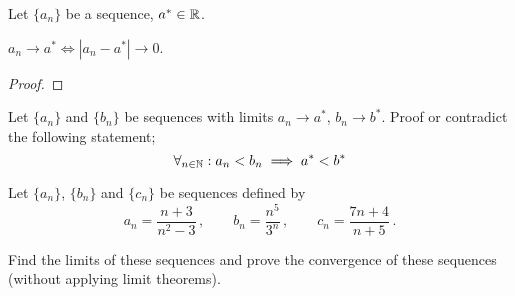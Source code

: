 \documentclass[week=2]{homework}
\begin{document}
\begin{questions}
    
	    \question
	    Let $\{a_n\}$ be a sequence, $a^* \in \mathbb{R}$.
	    
	    \begin{inlinetoprove}
	    	$a_n \to a^* \iff |a_n - a^*| \to 0$.
	    \end{inlinetoprove}
	    \begin{proof}
	    \end{proof}
    
	    \question
	    Let $\{a_n\}$ and $\{b_n\}$ be sequences with limits $a_n \to a^*$, $b_n \to b^*$.
	    Proof or contradict the following statement;
	    \[
		    \forall_{n \in \mathbb{N}}: a_n < b_n \implies a^* < b^*
	    \]
	    
	    
	    \question
	    Let $\{a_n\}$, $\{b_n\}$ and $\{c_n\}$ be sequences defined by
	    \[
		    a_n = \frac{n+3}{n^2-3}\,,\qquad b_n = \frac{n^5}{3^n}\,,\qquad c_n = \frac{7n+4}{n+5}\,.
	    \]
	    
	    Find the limits of these sequences and prove the convergence of these sequences (without applying limit theorems).
	    \begin{parts}
	    	\part
	    	
	    	\part 
	    	
	    	\part
	    \end{parts}
     \end{questions}
\end{document}
